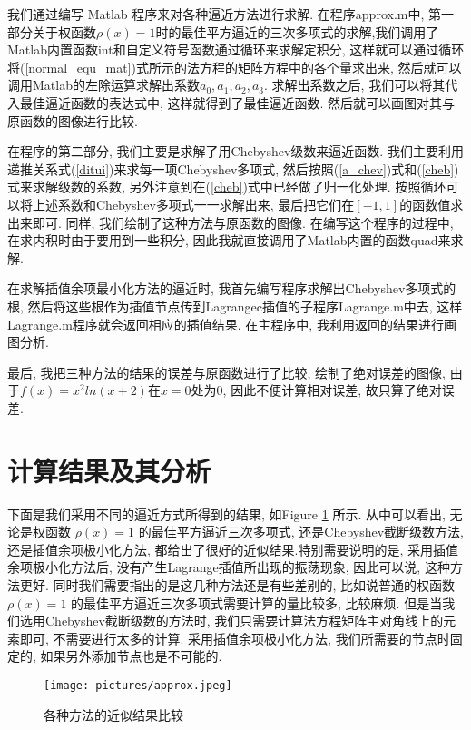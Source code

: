 \documentclass[a4paper]{article}
\begin{document}
\begin{spacing}{1.5}
\begin{CJK*}{GBK}{song}
我们通过编写 Matlab 程序来对各种逼近方法进行求解. 在程序approx.m中, 第一部分关于权函数$\rho(x)=1$时的最佳平方逼近的三次多项式的求解,我们调用了Matlab内置函数int和自定义符号函数通过循环来求解定积分, 这样就可以通过循环将(\ref{normal_equ_mat})式所示的法方程的矩阵方程中的各个量求出来, 然后就可以调用Matlab的左除运算求解出系数$a_0, a_1,a_2,a_3.$ 求解出系数之后, 我们可以将其代入最佳逼近函数的表达式中, 这样就得到了最佳逼近函数. 然后就可以画图对其与原函数的图像进行比较.\par
在程序的第二部分, 我们主要是求解了用Chebyshev级数来逼近函数. 我们主要利用递推关系式(\ref{ditui})来求每一项Chebyshev多项式, 然后按照(\ref{a_chev})式和(\ref{cheb})式来求解级数的系数, 另外注意到在(\ref{cheb})式中已经做了归一化处理. 按照循环可以将上述系数和Chebyshev多项式一一求解出来, 最后把它们在$[-1,1]$的函数值求出来即可. 同样, 我们绘制了这种方法与原函数的图像. 在编写这个程序的过程中, 在求内积时由于要用到一些积分, 因此我就直接调用了Matlab内置的函数quad来求解.\par

在求解插值余项最小化方法的逼近时, 我首先编写程序求解出Chebyshev多项式的根, 然后将这些根作为插值节点传到Lagrangec插值的子程序Lagrange.m中去, 这样Lagrange.m程序就会返回相应的插值结果. 在主程序中, 我利用返回的结果进行画图分析. \par

最后, 我把三种方法的结果的误差与原函数进行了比较, 绘制了绝对误差的图像, 由于$f(x)=x^2ln(x+2)$在$x=0$处为0, 因此不便计算相对误差, 故只算了绝对误差.

\section{计算结果及其分析}
下面是我们采用不同的逼近方式所得到的结果, 如Figure \ref{fig_res} 所示. 从中可以看出, 无论是权函数 $\rho(x)=1$ 的最佳平方逼近三次多项式, 还是Chebyshev截断级数方法, 还是插值余项极小化方法, 都给出了很好的近似结果.特别需要说明的是, 采用插值余项极小化方法后, 没有产生Lagrange插值所出现的振荡现象, 因此可以说, 这种方法更好. 同时我们需要指出的是这几种方法还是有些差别的, 比如说普通的权函数 $\rho(x)=1$ 的最佳平方逼近三次多项式需要计算的量比较多, 比较麻烦. 但是当我们选用Chebyshev截断级数的方法时, 我们只需要计算法方程矩阵主对角线上的元素即可, 不需要进行太多的计算. 采用插值余项极小化方法, 我们所需要的节点时固定的, 如果另外添加节点也是不可能的.


\begin{figure}[!htbp]
\centering\texttt{[image: pictures/approx.jpeg]}
\setlength{\abovecaptionskip}{0pt}
\caption{各种方法的近似结果比较}\label{fig_res}
\setlength{\belowcaptionskip}{0pt}
\end{figure}


\end{CJK*}
\end{spacing}
\end{document}
